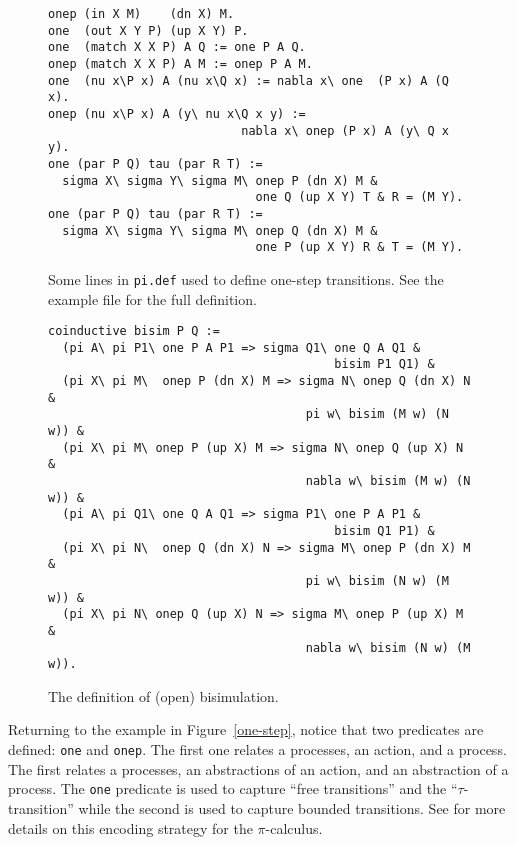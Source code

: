 \documentclass{article}
\begin{document}
\begin{figure}
\begin{verbatim}
onep (in X M)    (dn X) M.
one  (out X Y P) (up X Y) P.
one  (match X X P) A Q := one P A Q.
onep (match X X P) A M := onep P A M.
one  (nu x\P x) A (nu x\Q x) := nabla x\ one  (P x) A (Q x).
onep (nu x\P x) A (y\ nu x\Q x y) := 
                           nabla x\ onep (P x) A (y\ Q x y).
one (par P Q) tau (par R T) :=
  sigma X\ sigma Y\ sigma M\ onep P (dn X) M &
                             one Q (up X Y) T & R = (M Y).
one (par P Q) tau (par R T) :=
  sigma X\ sigma Y\ sigma M\ onep Q (dn X) M &
                             one P (up X Y) R & T = (M Y).
\end{verbatim}
\caption{Some lines in {\tt pi.def} used to define one-step
  transitions.  See the example file for the full definition.}
\label{one-step}

\begin{verbatim}
coinductive bisim P Q :=
  (pi A\ pi P1\ one P A P1 => sigma Q1\ one Q A Q1 &
                                        bisim P1 Q1) &
  (pi X\ pi M\  onep P (dn X) M => sigma N\ onep Q (dn X) N & 
                                    pi w\ bisim (M w) (N w)) &
  (pi X\ pi M\ onep P (up X) M => sigma N\ onep Q (up X) N &
                                    nabla w\ bisim (M w) (N w)) &
  (pi A\ pi Q1\ one Q A Q1 => sigma P1\ one P A P1 & 
                                        bisim Q1 P1) &
  (pi X\ pi N\  onep Q (dn X) N => sigma M\ onep P (dn X) M & 
                                    pi w\ bisim (N w) (M w)) &
  (pi X\ pi N\ onep Q (up X) N => sigma M\ onep P (up X) M &
                                    nabla w\ bisim (N w) (M w)).
\end{verbatim}
\caption{The definition of (open) bisimulation.}
\label{bisim}
\end{figure}

Returning to the example in Figure~\ref{one-step}, notice that two
predicates are defined: {\tt one} and {\tt onep}.  The first one
relates a processes, an action, and a process.  The first relates a 
processes, an abstractions of an action, and an abstraction of a
process.  The {\tt one} predicate is used to capture ``free
transitions'' and the ``$\tau$-transition'' while the second is used
to capture bounded transitions.  See \cite{tiu04fguc,tiu05concur} for
more details on this encoding strategy for the $\pi$-calculus.
\end{document}
